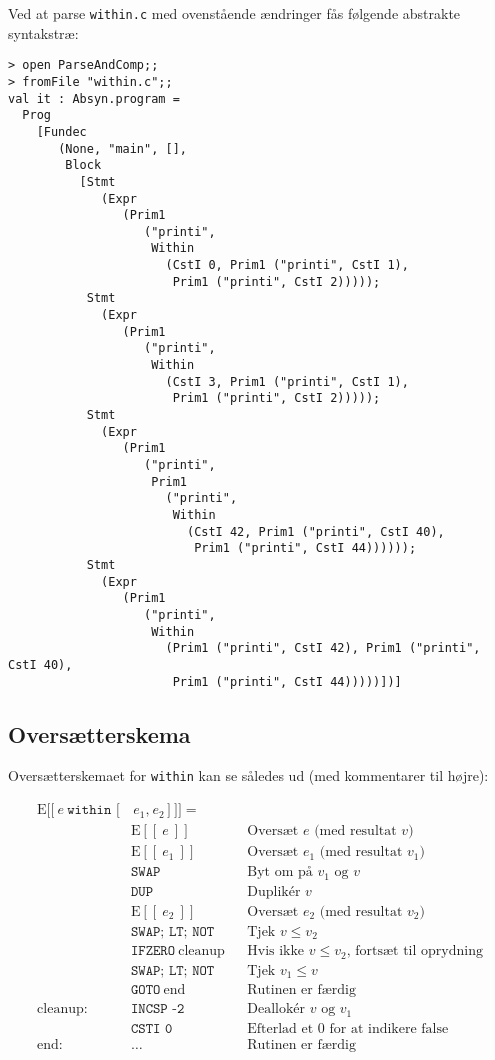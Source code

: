 Ved at parse \texttt{within.c} med ovenstående ændringer fås følgende abstrakte syntakstræ:

\begin{verbatim}
> open ParseAndComp;;
> fromFile "within.c";;
val it : Absyn.program =
  Prog
    [Fundec
       (None, "main", [],
        Block
          [Stmt
             (Expr
                (Prim1
                   ("printi",
                    Within
                      (CstI 0, Prim1 ("printi", CstI 1),
                       Prim1 ("printi", CstI 2)))));
           Stmt
             (Expr
                (Prim1
                   ("printi",
                    Within
                      (CstI 3, Prim1 ("printi", CstI 1),
                       Prim1 ("printi", CstI 2)))));
           Stmt
             (Expr
                (Prim1
                   ("printi",
                    Prim1
                      ("printi",
                       Within
                         (CstI 42, Prim1 ("printi", CstI 40),
                          Prim1 ("printi", CstI 44))))));
           Stmt
             (Expr
                (Prim1
                   ("printi",
                    Within
                      (Prim1 ("printi", CstI 42), Prim1 ("printi", CstI 40),
                       Prim1 ("printi", CstI 44)))))])]
\end{verbatim}

\subsection{Oversætterskema}

Oversætterskemaet for \texttt{within} kan se således ud (med kommentarer til højre):

\begin{align*}
    \mathrm{E}[\![\ e\ \texttt{within [}&\,e_1 \texttt{,}\ e_2\,\texttt{]}\ ]\!] = \\
    & \mathrm{E}[\![\ e \ ]\!]   && \text{Oversæt $e$ (med resultat $v$)} \\
    & \mathrm{E}[\![\ e_1 \ ]\!] && \text{Oversæt $e_1$ (med resultat $v_1$)} \\
    & \texttt{SWAP} && \text{Byt om på $v_1$ og $v$} \\
    & \texttt{DUP}   && \text{Duplikér $v$} \\
    & \mathrm{E}[\![\ e_2 \ ]\!]  && \text{Oversæt $e_2$ (med resultat $v_2$)} \\
    & \texttt{SWAP; LT; NOT}  && \text{Tjek $v \leq v_2$} \\
    & \texttt{IFZERO}\ \text{cleanup}  && \text{Hvis ikke $v \leq v_2$, fortsæt til oprydning} \\
    & \texttt{SWAP; LT; NOT}  && \text{Tjek $v_1 \leq v$} \\
    & \texttt{GOTO}\ \text{end}  && \text{Rutinen er færdig} \\
    \text{cleanup:}\ & \texttt{INCSP -2}  && \text{Deallokér $v$ og $v_1$} \\
    &\texttt{CSTI 0} && \text{Efterlad et 0 for at indikere false} \\
    \text{end:}\ & \ldots  && \text{Rutinen er færdig}
\end{align*}

